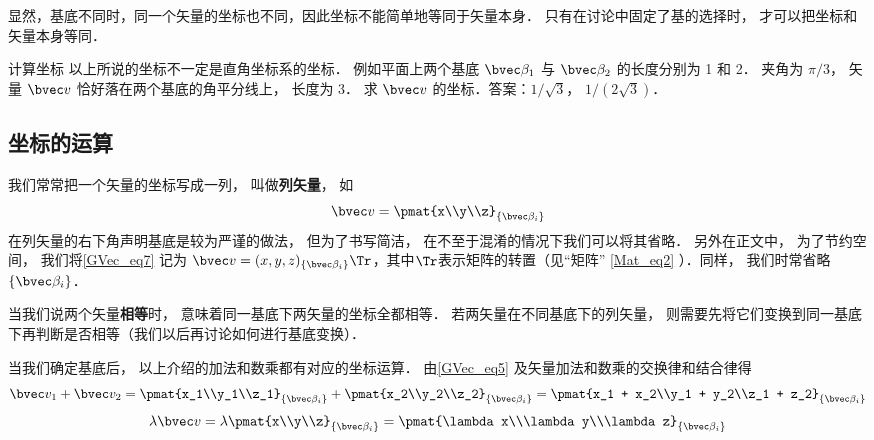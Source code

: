 显然，基底不同时，同一个矢量的坐标也不同，因此坐标不能简单地等同于矢量本身． 只有在讨论中固定了基的选择时， 才可以把坐标和矢量本身等同．

\begin{exercise}{计算坐标}
以上所说的坐标不一定是直角坐标系的坐标． 例如平面上两个基底 $\bvec \beta_1$ 与 $\bvec \beta_2$ 的长度分别为 1 和 2． 夹角为 $\pi/3$， 矢量 $\bvec v$ 恰好落在两个基底的角平分线上， 长度为 3． 求 $\bvec v$ 的坐标．答案：$1/\sqrt 3$， $1/(2\sqrt 3)$．
\end{exercise}

\subsection{坐标的运算}
我们常常把一个矢量的坐标写成一列， 叫做\textbf{列矢量}， 如
\begin{equation}\label{GVec_eq7}
\bvec v = \pmat{x\\y\\z}_{\{\bvec\beta_i\}}
\end{equation}
在列矢量的右下角声明基底是较为严谨的做法， 但为了书写简洁， 在不至于混淆的情况下我们可以将其省略． 另外在正文中， 为了节约空间， 我们将\autoref{GVec_eq7} 记为 $\bvec v = (x, y, z)_{\{\bvec\beta_i\}}\Tr$，其中$\Tr$表示矩阵的转置（见“矩阵” \autoref{Mat_eq2} ）．同样， 我们时常省略 $\{\bvec\beta_i\}$．

当我们说两个矢量\textbf{相等}时， 意味着同一基底下两矢量的坐标全都相等． 若两矢量在不同基底下的列矢量， 则需要先将它们变换到同一基底下再判断是否相等（我们以后再讨论如何进行基底变换）．

当我们确定基底后， 以上介绍的加法和数乘都有对应的坐标运算． 由\autoref{GVec_eq5} 及矢量加法和数乘的交换律和结合律得
\begin{equation}\label{GVec_eq8}
\bvec v_1 + \bvec v_2 = \pmat{x_1\\y_1\\z_1}_{\{\bvec\beta_i\}} + \pmat{x_2\\y_2\\z_2}_{\{\bvec\beta_i\}} = \pmat{x_1 + x_2\\y_1 + y_2\\z_1 + z_2}_{\{\bvec\beta_i\}}
\end{equation}
\begin{equation}\label{GVec_eq9}
\lambda \bvec v = \lambda\pmat{x\\y\\z}_{\{\bvec\beta_i\}} = \pmat{\lambda x\\\lambda y\\\lambda z}_{\{\bvec\beta_i\}}
\end{equation}

